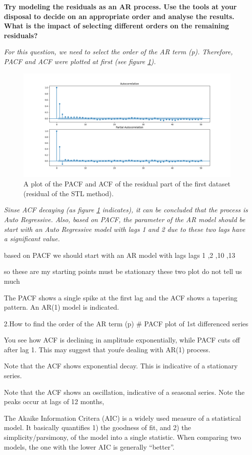 \item \textbf{Try modeling the residuals as an AR process. Use the tools at your disposal to decide on an appropriate order and analyse the results. What is the impact of selecting different orders on the remaining residuals?}

\textit{For this question, we need to select the order of the \gls{AR} term (p). Therefore, \gls{PACF} and \gls{ACF} were plotted at first (see figure \ref{fig:Ass1_D1_PACF_ACF_X}).}  

\begin{figure}[H]
    \centering
    \begin{minipage}[b]{1\textwidth}
        \includegraphics[width=\textwidth]{figures/Ass1/Ass1_D1_PACF_ACF_X.png}
    \end{minipage}
    \caption{A plot of the \gls{PACF} and \gls{ACF} of the residual part of the first dataset (residual of the STL method).}
    \label{fig:Ass1_D1_PACF_ACF_X}
\end{figure}

\textit{Sinse \gls{ACF} decaying (as figure \ref{fig:Ass1_D1_PACF_ACF_X} indicates), it can be concluded that the process is Auto Regressive. Also, based on PACF, the parameter of the \gls{AR} model should be start with an Auto Regressive model with lags 1 and 2 due to these two lags have a significant value.}



based on PACF we should start with an AR model with lags lags 1 ,2 ,10 ,13

so these are my starting points
must be stationary
these two plot do not tell us much


The PACF shows a single spike at the first lag and the ACF shows a tapering pattern. An AR(1) model is indicated.

2.How to find the order of the AR term (p)
\# PACF plot of 1st differenced series


You see how ACF is declining in amplitude exponentially, while PACF cuts off after lag 1. This may suggest that you\'re dealing with AR(1) process.

Note that the ACF shows exponential decay. This is indicative of a stationary series.

Note that the ACF shows an oscillation, indicative of a seasonal series. Note the peaks occur at lags of 12 months, 

The Akaike Information Critera (AIC) is a widely used measure of a statistical model. It basically quantifies 1) the goodness of fit, and 2) the simplicity/parsimony, of the model into a single statistic. When comparing two models, the one with the lower AIC is generally “better”.